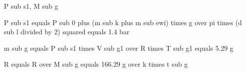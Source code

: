 P sub s1, M sub g

P sub s1 equals P sub 0 plus (m sub k plus m sub ewi) times g over pi times (d sub l divided by 2) squared equals 1.4 bar

m sub g equals P sub s1 times V sub g1 over R times T sub g1 equals 5.29 g

R equals R over M sub g equals 166.29 g over k times t sub g